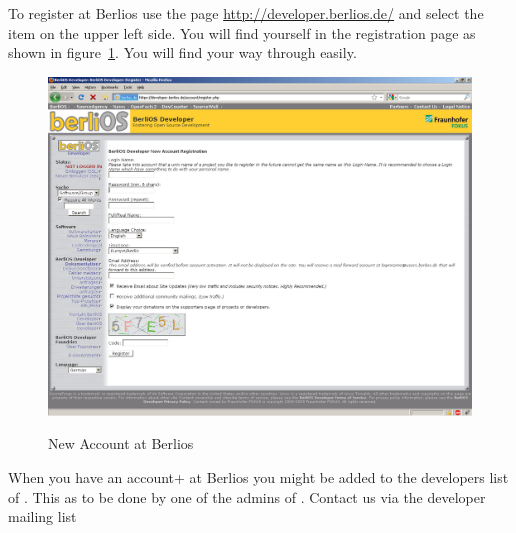 To register at Berlios use the page \url{http://developer.berlios.de/}
and select the item  on the upper left side. You
will find yourself in the registration page as shown in
figure~\ref{fig:berlios-register}. You will find your way through
easily.
\begin{figure}[htbp]
  \centering  \includegraphics[scale=.33]{image/berlios-register}
  \caption{New Account at Berlios}\label{fig:berlios-register}
\end{figure}

When you have an \+account+ at Berlios you might be added to the
developers list of \ExTeX. This as to be done by one of the admins of
\ExTeX. Contact us via the developer mailing list 


